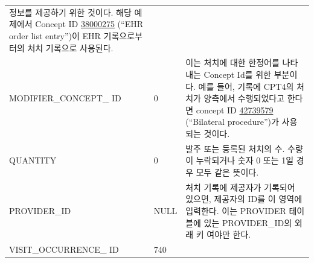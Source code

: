 \documentclass[11pt]{book}
\theoremstyle{definition}
\theoremstyle{definition}
\theoremstyle{definition}
\theoremstyle{remark}
\begin{document}
\begin{longtable}[]{@{}lll@{}}
\begin{minipage}[t]{0.48\columnwidth}
정보를 제공하기 위한 것이다. 해당 예제에서 Concept ID
\href{http://athena.ohdsi.org/search-terms/terms/38000275}{38000275}
(``EHR order list entry'')이 EHR 기록으로부터의 처치 기록으로
사용된다.\strut
\end{minipage}\tabularnewline
\begin{minipage}[t]{0.28\columnwidth}\raggedright\strut
MODIFIER\_CONCEPT\_ ID\strut
\end{minipage} & \begin{minipage}[t]{0.16\columnwidth}\raggedright\strut
0\strut
\end{minipage} & \begin{minipage}[t]{0.48\columnwidth}\raggedright\strut
이는 처치에 대한 한정어를 나타내는 Concept Id를 위한 부분이다. 예를
들어, 기록에 CPT4의 처치가 양측에서 수행되었다고 한다면 concept ID
\href{http://athena.ohdsi.org/search-terms/terms/42739579}{42739579}
(``Bilateral procedure'')가 사용되는 것이다.\strut
\end{minipage}\tabularnewline
\begin{minipage}[t]{0.28\columnwidth}\raggedright\strut
QUANTITY\strut
\end{minipage} & \begin{minipage}[t]{0.16\columnwidth}\raggedright\strut
0\strut
\end{minipage} & \begin{minipage}[t]{0.48\columnwidth}\raggedright\strut
발주 또는 등록된 처치의 수. 수량이 누락되거나 숫자 0 또는 1일 경우 모두
같은 뜻이다.\strut
\end{minipage}\tabularnewline
\begin{minipage}[t]{0.28\columnwidth}\raggedright\strut
PROVIDER\_ID\strut
\end{minipage} & \begin{minipage}[t]{0.16\columnwidth}\raggedright\strut
NULL\strut
\end{minipage} & \begin{minipage}[t]{0.48\columnwidth}\raggedright\strut
처치 기록에 제공자가 기록되어 있으면, 제공자의 ID를 이 영역에 입력한다.
이는 PROVIDER 테이블에 있는 PROVIDER\_ID의 외래 키 여야만 한다.\strut
\end{minipage}\tabularnewline
\begin{minipage}[t]{0.28\columnwidth}\raggedright\strut
VISIT\_OCCURRENCE\_ ID\strut
\end{minipage} & \begin{minipage}[t]{0.16\columnwidth}\raggedright\strut
740\strut
\end{minipage} & \begin{minipage}[t]{0.48\columnwidth}\raggedright\strut

\end{minipage}
\end{longtable}
\end{document}
